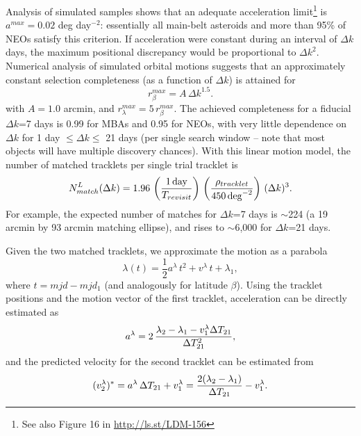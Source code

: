 Analysis of simulated samples shows that an adequate acceleration limit\footnote{See also
Figure 16 in \url{http://ls.st/LDM-156}} is $a^{max}=0.02$ deg day$^{-2}$: essentially
all main-belt asteroids and more than 95\% of NEOs satisfy this criterion. If acceleration
were constant during an interval of $\Delta k$ days, the maximum positional discrepancy
would be proportional to $\Delta k^2$. Numerical analysis of simulated orbital motions
suggests that an approximately constant selection completeness (as a function of $\Delta k$)
is attained for
\begin{equation}
\label{eq:matching1}
                r_\beta^{max} = A \, \Delta k^{1.5}.
\end{equation}
with $A=1.0$ arcmin, and $r_\lambda^{max} = 5 \, r_\beta^{max}$. The achieved completeness for
a fiducial $\Delta k$=7 days is 0.99 for MBAs and 0.95 for NEOs, with very little dependence
on $\Delta k$ for 1 day $\le \Delta k \le$ 21 days (per single search window -- note that most
objects will have multiple discovery chances).  With this linear motion model, the number
of matched tracklets per single trial tracklet is
\begin{equation}
\label{eq:Nmdk2}
   N^{L}_{match}(\Delta k) = 1.96 \, \left({1 \, {\rm day} \over T_{revisit}}\right) \,
                    \left( \rho_{tracklet}  \over 450 \, {\rm deg}^{-2} \right) \, (\Delta k)^3.
\end{equation}
For example,  the expected number of matches for $\Delta k$=7 days is $\sim$224
(a 19 arcmin by 93 arcmin matching ellipse), and rises to $\sim$6,000 for
$\Delta k$=21 days.

Given the two matched tracklets, we approximate the motion as a parabola
\begin{equation}
\label{eq:parabola}
          \lambda(t) = \frac{1}{2}a^\lambda \, t^2 + v^\lambda \, t + \lambda_1,
\end{equation}
where $t = mjd - mjd_1$ (and analogously for latitude $\beta$).  Using the tracklet
positions and the motion vector of the first tracklet, acceleration can be directly
estimated as
\begin{equation}
 \label{eq:accPred}
             a^\lambda = 2 \, {\lambda_2- \lambda_1 - v_1^\lambda \Delta T_{21} \over \Delta T^2_{21}},
\end{equation}
and the predicted velocity for the second tracklet can be estimated from
\begin{equation}
\label{eq:v2cut}
        (v^\lambda_2)^\ast =  a^\lambda \,\Delta T_{21}  + v_1^\lambda =
      {2(\lambda_2- \lambda_1) \over \Delta T_{21}}  - v_1^\lambda.
\end{equation}

